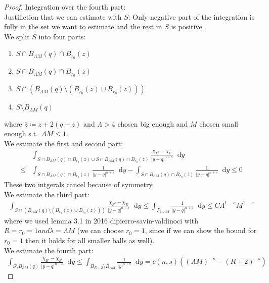 \documentclass[11pt]{article}
\newcommand*{\dd}[1]{\mathop{}\!\mathrm{d}#1} %
\begin{document}
\begin{proof}
	Integration over the fourth part: \\
	Justifiction that we can estimate with \( S \): Only negative part of the integration
	is fully in the set we want to estimate and the rest in \( S \) is positive. \\
	We split \( S \) into four parts:
	\begin{enumerate}[label = \roman*)]
		\item \( S \cap B_{\Lambda M} (q) \cap B_{r_0}(z) \)
		\item \( S \cap B_{\Lambda M} (q) \cap B_{r_0}( \overline{z}) \)
		\item \( S \cap (B_{\Lambda M} (q)\setminus ( B_{r_0}(z) \cup B_{r_0}(\overline{z}))) \)
		\item \( S \setminus B_{\Lambda M} (q) \)
	\end{enumerate}
	where \( \overline{z}\coloneqq z + 2(q-z) \) and \( \Lambda > 4 \) chosen big enough
	and \( M \) chosen small enough s.t.\ \( \Lambda M \leq 1 \). \\
	We estimate the first and second part:
	\begin{align*}
		     & \int_{S \cap B_{\Lambda M} (q) \cap B_{r_0}(z) \cup S \cap B_{\Lambda M} (q) \cap B_{r_0}(\overline{z})} \frac{\chi_{E^c}- \chi_E}{\lvert y-q\rvert^{n+s}} \dd{y} \\
		\leq & \int_{S \cap B_{\Lambda M} (q) \cap B_{r_0}(z)} \frac{1}{\lvert y-q\rvert^{n+s}} \dd{y} - \int_{S \cap B_{\Lambda M} (q) \cap B_{r_0}(\overline{z})} \frac{1}{\lvert y-q\rvert^{n+s}} \dd{y} \leq 0
	\end{align*}
	These two intgerals cancel because of symmetry. \\
	We estimate the third part:
	\begin{gather*}
		\int_{S \cap (B_{\Lambda M} (q)\setminus ( B_{r_0}(z) \cup B_{r_0}(z)))}\frac{\chi_{E^c}- \chi_E}{\lvert y-q\rvert^{n+s}} \dd{y} \leq \int_{P_{1,\Lambda M}} \frac{1}{\lvert y-q\rvert^{n+s}} \dd{y} \leq C \Lambda^{1-s} M^{1-s}
	\end{gather*}
	where we used lemma 3.1 in 2016 dipierro-savin-valdinoci with \( R = r_0 = 1 and \lambda
	= \Lambda M \) (we can choose \( r_0 = 1 \), since if we can show the bound for \(
	r_0 = 1 \) then it holds for all smaller balls as well). \\
	We estimate the fourth part:
	\begin{gather*}
		\int_{S\setminus B_{\Lambda M} (q)} \frac{\chi_{E^c}- \chi_E}{\lvert y-q\rvert^{n+s}} \dd{y} \leq \int_{B_{R+2}\setminus B_{\Lambda M}} \frac{1}{\lvert y\rvert^{n+s}} \dd{y} = c(n,s)((\Lambda M)^{-s} - (R+2)^{-s})

\end{gather*}
\end{proof}
\end{document}
